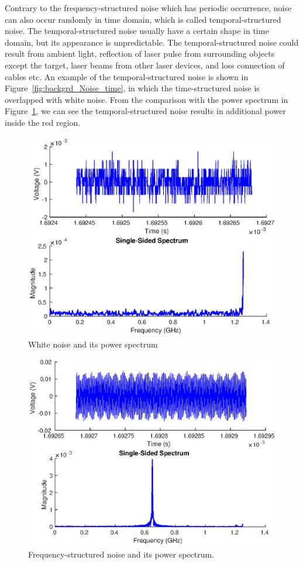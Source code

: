 Contrary to the frequency-structured noise which has periodic occurrence, noise can also occur randomly in time domain, which is called temporal-structured noise. The temporal-structured noise usually have a certain shape in time domain, but its appearance is unpredictable. The temporal-structured noise could result from ambient light, reflection of laser pulse from surrounding objects except the target,  laser beams from other laser devices, and loss connection of cables etc. An example of the temporal-structured noise is shown in Figure~\ref{fig:backgrd_Noise_time}, in which the time-structured noise is overlapped with white noise. From the comparison with the power spectrum in Figure~\ref{fig:backgrd_Noise_white}, we can see the temporal-structured noise results in additional power inside the red region.
\begin{figure}[t!p]
\centering
\includegraphics[width=.8\textwidth]{figures/chapter_background/Noise_white_sig_FFT_regWhiteNoise.eps}
\caption{White noise and its power spectrum}
\label{fig:backgrd_Noise_white}
\end{figure}
\begin{figure}[t!p]
\centering
\includegraphics[width=.8\textwidth]{figures/chapter_background/Noise_freqStruct_sig_FFT_SineNoise2.eps}
\caption{Frequency-structured noise and its power spectrum.}
\label{fig:backgrd_Noise_frequency}
\end{figure}
